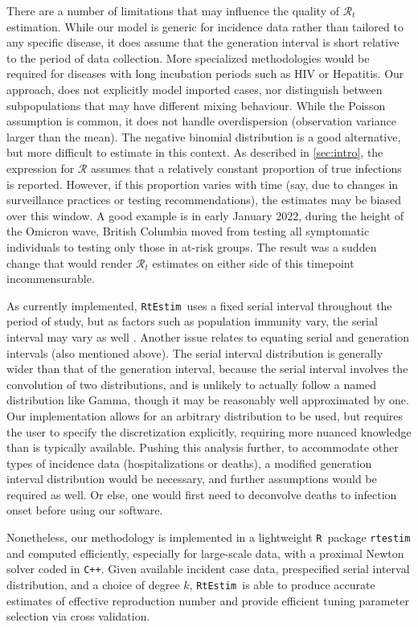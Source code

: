 \documentclass[10pt,letterpaper]{article}
\newcommand{\R}{\texttt{R}}
\newcommand{\cpp}{\texttt{C++}}
\def\RtEstim{\texttt{RtEstim}}
\def\calR{\mathcal{R}}
\newcommand{\citep}[1]{\cite{#1}}
\begin{document}
There are a number of limitations that may influence the quality of
$\calR_t$ estimation. While our model is generic for incidence data 
rather than tailored to any specific disease, it does assume that the 
generation interval is short relative to the period of data collection. 
More specialized methodologies would be required for diseases with long 
incubation periods such as HIV or Hepatitis. 
Our approach, does not explicitly model imported cases, nor distinguish between
subpopulations that may have different mixing behaviour. 
While the Poisson assumption is common, it does not handle overdispersion
(observation variance larger than the mean). The negative binomial distribution
is a good alternative, but more difficult to estimate in this context.
As described in \autoref{sec:intro}, the expression for $\calR$ 
assumes that a relatively constant proportion of true infections is reported. 
However, if this proportion varies with time (say, due to changes in surveillance
practices or testing recommendations), the estimates may be biased over this
window. A good example is in early January 2022, during the height of the
Omicron wave, British Columbia moved from testing all symptomatic individuals to
testing only those in at-risk groups. The result was a sudden change that would
render $\calR_t$ estimates on either side of this timepoint incommensurable.


As currently implemented, \RtEstim\ uses a fixed serial interval throughout the
period of study, but as factors such as population immunity vary, the serial
interval may vary as well \citep{nash2023estimating}.  
Another issue relates to equating serial and generation intervals (also
mentioned above). The serial interval distribution is generally wider than that
of the generation interval, because the serial interval involves the convolution
of two distributions, and is unlikely to actually follow a named distribution
like Gamma, though it may be reasonably well approximated by one. Our
implementation allows for an arbitrary distribution to be used, but requires the
user to specify the discretization explicitly, requiring more nuanced knowledge
than is typically available. Pushing this analysis further, to accommodate other
types of incidence data (hospitalizations or deaths), a modified generation
interval distribution would be necessary, and further assumptions would be
required as well. Or else, one would first need to deconvolve deaths to
infection onset before using our software.


Nonetheless, our methodology is implemented in a lightweight \R\ package 
\texttt{rtestim} and computed efficiently, especially for large-scale data, 
with a proximal Newton solver coded in \cpp. 
Given available incident case data, prespecified serial interval
distribution, and a choice of degree $k$, \RtEstim\ is able to produce
accurate estimates of effective reproduction number and provide efficient
tuning parameter selection via cross validation. 
\end{document}
